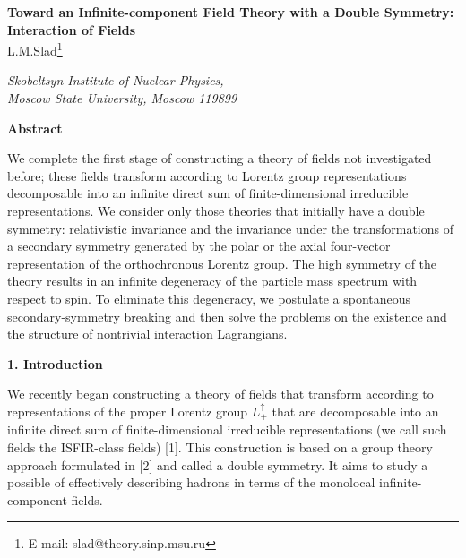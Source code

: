 \documentclass[a4paper,12pt]{article}
\begin{document}
\vspace*{1.0 cm}

\begin{center}
{\Large \bf Toward an Infinite-component Field Theory with a Double Symmetry:
Interaction of Fields} \\

\vspace{1.0 cm}
\renewcommand{\thefootnote}{*}
{\large L.M.Slad\footnote{E-mail: slad@theory.sinp.msu.ru}} \\

\vspace{0.4 cm}

{\it Skobeltsyn Institute of Nuclear Physics, \\
Moscow State University, Moscow 119899}
\end{center}

\vspace{0.5 cm}

\centerline{\bf Abstract}

\begin{small}
We complete the first stage of constructing a theory of fields not investigated
before; these fields transform according to Lorentz group representations
decomposable into an infinite direct sum of finite-dimensional irreducible
representations. We consider only those theories that initially have a double
symmetry: relativistic invariance and the invariance under the transformations
of a secondary symmetry generated by the polar or the axial four-vector
representation of the orthochronous Lorentz group. The high symmetry of the
theory results in an infinite degeneracy of the particle mass spectrum with
respect to spin. To eliminate this degeneracy, we postulate a spontaneous
secondary-symmetry breaking and then solve the problems on the existence and
the structure of nontrivial interaction Lagrangians.
\end{small}

\vspace{0.5 cm}

\begin{center}
{\large \bf 1. Introduction}
\end{center}

We recently began constructing a theory of fields that transform according 
to representations of the proper Lorentz group $L^{\uparrow}_{+}$ that are
decomposable into an infinite direct sum of finite-dimensional irreducible
representations (we call such fields the ISFIR-class fields) [1]. This
construction is based on a group theory approach formulated in [2] and called
a double symmetry. It aims to study a possible of effectively describing 
hadrons in terms of the monolocal infinite-component fields.
  
\end{document}
